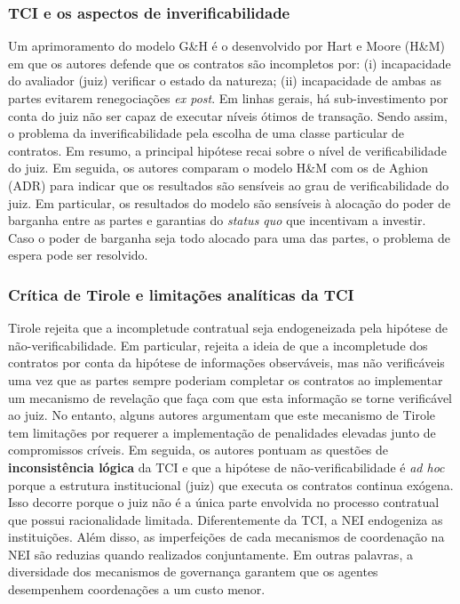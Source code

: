 \subsubsection*{TCI e os aspectos de inverificabilidade}

Um aprimoramento do modelo G\&H é o desenvolvido por Hart e Moore (H\&M) em que os autores  defende que os contratos são incompletos por: (i) incapacidade do avaliador (juiz) verificar o estado da natureza; (ii) incapacidade de ambas as partes evitarem renegociações \textit{ex post}. Em linhas gerais, há sub-investimento por conta do juiz não ser capaz de executar níveis ótimos de transação. Sendo assim, o problema da inverificabilidade pela escolha de uma classe particular de contratos. Em resumo, a principal hipótese recai sobre o nível de verificabilidade do juiz. 
Em seguida, os autores comparam o modelo H\&M com os de Aghion (ADR) para indicar  que os resultados são sensíveis ao grau de verificabilidade do juiz. Em particular, os resultados do modelo são sensíveis à alocação do poder de barganha entre as partes e garantias do \textit{status quo} que incentivam a investir. Caso o poder de barganha seja todo alocado para uma das partes, o problema de espera pode ser resolvido.

\subsubsection*{Crítica de Tirole e limitações analíticas da TCI}

Tirole rejeita que a incompletude contratual seja endogeneizada pela hipótese de não-verificabilidade. Em particular, rejeita a ideia de que a incompletude dos contratos por conta da hipótese de informações observáveis, mas não verificáveis uma vez que as partes sempre poderiam completar os contratos ao implementar um mecanismo de revelação que faça com que esta informação se torne verificável ao juiz.
No entanto, alguns autores argumentam que este mecanismo de Tirole tem limitações por requerer a implementação de penalidades elevadas junto de compromissos críveis. Em seguida, os autores pontuam as questões de \textbf{inconsistência lógica} da TCI e que a hipótese de não-verificabilidade é \textit{ad hoc} porque a estrutura institucional (juiz) que executa os contratos continua exógena. Isso decorre porque o juiz não é a única parte envolvida no processo contratual que possui racionalidade limitada.
Diferentemente da TCI, a NEI endogeniza as instituições. Além disso, as imperfeições de cada mecanismos de coordenação na NEI são reduzias quando realizados conjuntamente. Em outras palavras, a diversidade dos mecanismos de governança garantem que os agentes desempenhem coordenações a um custo menor.

